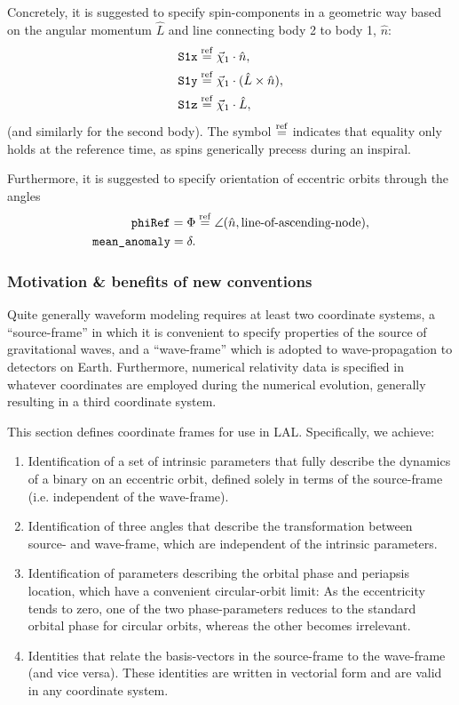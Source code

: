 \documentclass[11pt,tightenlines,article,amssymb,amsmath,amsfonts,superscriptaddress]{revtex4}
\newcommand{\nNR}{\hat{n}}
\newcommand{\lNR}{\hat L}
\newcommand{\phiRef}{\Phi} %
\newcommand{\equalref}{\overset{\rm ref}{=}}
\begin{document}
Concretely, it is suggested to specify spin-components in a geometric
way based on the angular momentum $\lNR$ and line connecting body 2 to
body 1, $\nNR$:
\begin{align}
  \mbox{\tt S1x}&\equalref \vec\chi_1\cdot\nNR,\\
  \mbox{\tt S1y}&\equalref \vec\chi_1\cdot (\lNR\times\nNR),\\
  \mbox{\tt S1z}&\equalref \vec\chi_1\cdot\lNR,
\end{align}
(and similarly for the second body).  The symbol $\equalref$ indicates
that equality only holds at the reference time, as spins generically
precess during an inspiral.

Furthermore, it is suggested to specify
orientation of eccentric orbits through the angles
\begin{align}
  \mbox{\tt phiRef} = \phiRef &\equalref \angle(\nNR, \mbox{line-of-ascending-node}),\\
  \mbox{\tt mean\_anomaly}= \delta.& %
  \end{align}


\subsubsection{Motivation \& benefits of new conventions}

Quite generally waveform modeling requires at least two coordinate
systems, a ``source-frame'' in which it is convenient to specify
properties of the source of gravitational waves, and a ``wave-frame''
which is adopted to wave-propagation to detectors on Earth.
Furthermore, numerical relativity data is specified in whatever
coordinates are employed during the numerical evolution, generally
resulting in a third coordinate system.

This section defines coordinate frames for use in LAL.  Specifically, we
achieve:
\begin{enumerate}
  \item Identification of a set of intrinsic parameters that fully
    describe the dynamics of a binary on an eccentric orbit,
    defined solely in terms of the source-frame (i.e. independent of
    the wave-frame).
  \item Identification of three angles that describe the
    transformation between source- and wave-frame, which are
    independent of the intrinsic parameters.
  \item Identification of parameters describing the orbital phase and
    periapsis location, which have a convenient circular-orbit limit:
    As the eccentricity tends to zero, one of the two phase-parameters
    reduces to the standard orbital phase for circular orbits, whereas
    the other becomes irrelevant.
  \item Identities that relate the basis-vectors in the source-frame to the
    wave-frame (and vice versa).  These identities are written in
    vectorial form and are valid in any coordinate system.
\end{enumerate}
\end{document}
